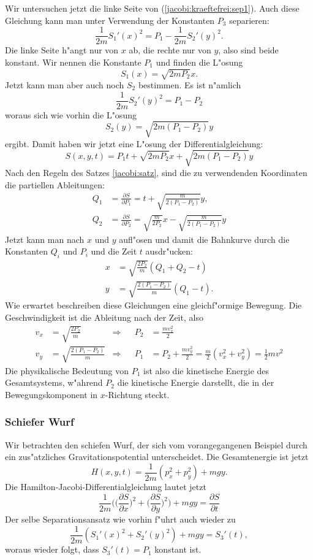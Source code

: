 Wir untersuchen jetzt die linke Seite von (\ref{jacobi:kraeftefrei:sep1}).
Auch diese Gleichung kann man unter Verwendung der Konstanten $P_3$
separieren:
\[
\frac1{2m} S_1'(x)^2
=
P_1-\frac1{2m}S_2'(y)^2.
\]
Die linke Seite h"angt nur von $x$ ab, die rechte nur von $y$, also
sind beide konstant. 
Wir nennen die Konstante $P_1$ und finden die L"osung
\[
S_1(x)
=
\sqrt{2mP_2}x.
\]
Jetzt kann man aber auch noch $S_2$ bestimmen. Es ist n"amlich 
\[
\frac1{2m} S_2'(y)^2
=P_1-P_2
\]
woraus sich wie vorhin die L"osung
\[
S_2(y)
=
\sqrt{2m(P_1-P_2)}y
\]
ergibt. Damit haben wir jetzt eine L"osung der Differentialgleichung:
\[
S(x,y,t)=
P_1t
+
\sqrt{2mP_2}x
+
\sqrt{2m(P_1-P_2)}y
\]
Nach den Regeln des Satzes \ref{jacobi:satz}, sind die zu verwendenden
Koordinaten die partiellen Ableitungen:
\begin{align*}
Q_1&=\frac{\partial S}{\partial P_1}
=
t + \sqrt{\frac{m}{2(P_1-P_2)}}y,\\
Q_2&=\frac{\partial S}{\partial P_2}
=
\sqrt{\frac{m}{2P_2}}x
-
\sqrt{\frac{m}{2(P_1-P_2)}}y
\end{align*}
Jetzt kann man nach $x$ und $y$ aufl"osen und damit die
Bahnkurve durch die Konstanten $Q_i$ und $P_i$ und die Zeit $t$
ausdr"ucken:
\begin{align*}
x&=\sqrt{\frac{2P_2}{m}}(Q_1+Q_2-t)\\
y&=\sqrt{\frac{2(P_1-P_2)}{m}}(Q_1-t).
\end{align*}
Wie erwartet beschreiben diese Gleichungen eine gleichf"ormige
Bewegung. Die Geschwindigkeit ist die Ableitung nach der Zeit,
also
\begin{align*}
v_x
&=
\sqrt{\frac{2P_2}{m}}
&\Rightarrow&&
P_2&=\frac{mv_x^2}2
\\
v_y
&=
\sqrt{\frac{2(P_1-P_2)}{m}}
&\Rightarrow&&
P_1&=P_2+\frac{mv_y^2}2=\frac{m}2(v_x^2+v_y^2)=\frac12mv^2
\end{align*}
Die physikalische Bedeutung von $P_1$ ist also die kinetische
Energie des
Gesamtsystems, w"ahrend $P_2$ die kinetische Energie darstellt, die in
der Bewegungskomponent in $x$-Richtung steckt.

\subsubsection{Schiefer Wurf}
Wir betrachten den schiefen Wurf, der sich vom vorangegangenen
Beispiel durch ein zus"atzliches Gravitationspotential
unterscheidet. Die Gesamtenergie ist jetzt
\[
H(x,y,t)=\frac1{2m}(p_x^2+p_y^2)+mgy.
\]
Die Hamilton-Jacobi-Differentialgleichung lautet jetzt
\[
\frac1{2m}\biggl(
\biggl(\frac{\partial S}{\partial x}\biggr)^2
+
\biggl(\frac{\partial S}{\partial y}\biggr)^2
\biggr)
+mgy=\frac{\partial S}{\partial t} 
\]
Der selbe Separationsansatz wie vorhin f"uhrt auch wieder zu
\[
\frac1{2m}(S_1'(x)^2+S_2'(y)^2)+mgy=S_3'(t),
\]
woraus wieder folgt, dass $S_3'(t)=P_1$ konstant ist.

